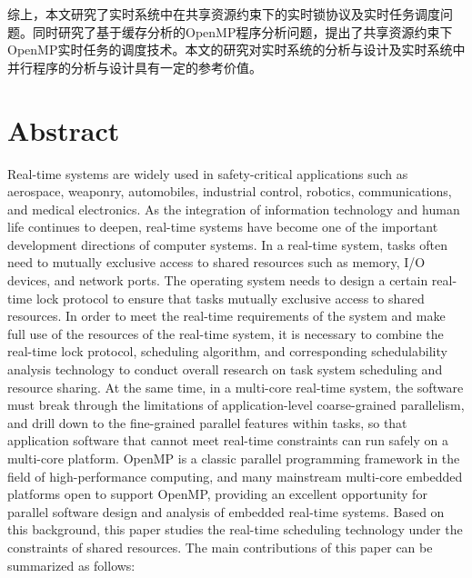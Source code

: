 综上，本文研究了实时系统中在共享资源约束下的实时锁协议及实时任务调度问题。同时研究了基于缓存分析的OpenMP程序分析问题，提出了共享资源约束下OpenMP实时任务的调度技术。本文的研究对实时系统的分析与设计及实时系统中并行程序的分析与设计具有一定的参考价值。

\chapter{Abstract}%

Real-time systems are widely used in safety-critical applications such as aerospace, weaponry, automobiles, industrial control, robotics, communications, and medical electronics. As the integration of information technology and human life continues to deepen, real-time systems have become one of the important development directions of computer systems. In a real-time system, tasks often need to mutually exclusive access to shared resources such as memory, I/O devices, and network ports. The operating system needs to design a certain real-time lock protocol to ensure that tasks mutually exclusive access to shared resources. In order to meet the real-time requirements of the system and make full use of the resources of the real-time system, it is necessary to combine the real-time lock protocol, scheduling algorithm, and corresponding schedulability analysis technology to conduct overall research on task system scheduling and resource sharing. At the same time, in a multi-core real-time system, the software must break through the limitations of application-level coarse-grained parallelism, and drill down to the fine-grained parallel features within tasks, so that application software that cannot meet real-time constraints can run safely on a multi-core platform. OpenMP is a classic parallel programming framework in the field of high-performance computing, and many mainstream multi-core embedded platforms open to support OpenMP, providing an excellent opportunity for parallel software design and analysis of embedded real-time systems. Based on this background, this paper studies the real-time scheduling technology under the constraints of shared resources. The main contributions of this paper can be summarized as follows:


